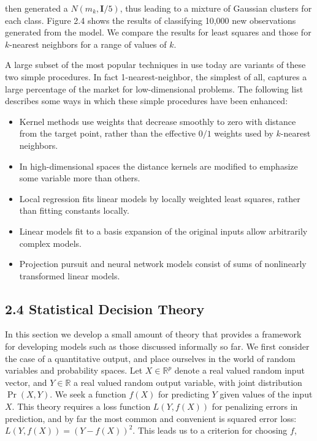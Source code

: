 \documentclass[10pt]{article}
\begin{document}
then generated a $N\left(m_{k}, \mathbf{I} / 5\right)$, thus leading to a mixture of Gaussian clusters for each class. Figure 2.4 shows the results of classifying 10,000 new observations generated from the model. We compare the results for least squares and those for $k$-nearest neighbors for a range of values of $k$.

A large subset of the most popular techniques in use today are variants of these two simple procedures. In fact 1-nearest-neighbor, the simplest of all, captures a large percentage of the market for low-dimensional problems. The following list describes some ways in which these simple procedures have been enhanced:

\begin{itemize}
  \item Kernel methods use weights that decrease smoothly to zero with distance from the target point, rather than the effective $0 / 1$ weights used by $k$-nearest neighbors.
  \item In high-dimensional spaces the distance kernels are modified to emphasize some variable more than others.
  \item Local regression fits linear models by locally weighted least squares, rather than fitting constants locally.
  \item Linear models fit to a basis expansion of the original inputs allow arbitrarily complex models.
  \item Projection pursuit and neural network models consist of sums of nonlinearly transformed linear models.
\end{itemize}

\subsection*{2.4 Statistical Decision Theory}
In this section we develop a small amount of theory that provides a framework for developing models such as those discussed informally so far. We first consider the case of a quantitative output, and place ourselves in the world of random variables and probability spaces. Let $X \in \mathbb{R}^{p}$ denote a real valued random input vector, and $Y \in \mathbb{R}$ a real valued random output variable, with joint distribution $\operatorname{Pr}(X, Y)$. We seek a function $f(X)$ for predicting $Y$ given values of the input $X$. This theory requires a loss function $L(Y, f(X))$ for penalizing errors in prediction, and by far the most common and convenient is squared error loss: $L(Y, f(X))=(Y-f(X))^{2}$. This leads us to a criterion for choosing $f$,
\end{document}
